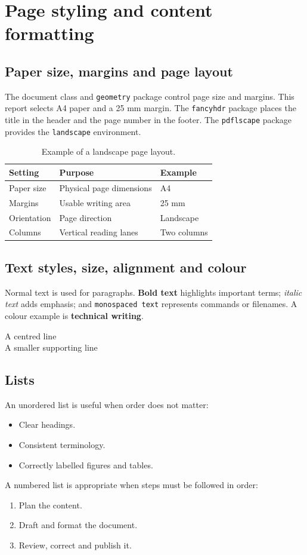 \section{Page styling and content formatting}\label{sec:formatting}
\subsection{Paper size, margins and page layout}
The document class and \texttt{geometry} package control page size and margins. This report selects A4 paper and a 25 mm margin. The \texttt{fancyhdr} package places the title in the header and the page number in the footer. The \texttt{pdflscape} package provides the \texttt{landscape} environment.
\begin{landscape}
\begin{table}[H]\centering
\caption{Example of a landscape page layout.}
\begin{tabularx}{0.88\linewidth}{lXl}
\toprule Setting & Purpose & Example\\\midrule
Paper size & Physical page dimensions & A4\\
Margins & Usable writing area & 25 mm\\
Orientation & Page direction & Landscape\\
Columns & Vertical reading lanes & Two columns\\
\bottomrule
\end{tabularx}
\end{table}
\end{landscape}
\subsection{Text styles, size, alignment and colour}
Normal text is used for paragraphs. \textbf{Bold text} highlights important terms; \textit{italic text} adds emphasis; and \texttt{monospaced text} represents commands or filenames. A colour example is {\color{Teal}\textbf{technical writing}}.
\begin{center}{\Large A centred line}\\[4pt]{\small A smaller supporting line}\end{center}
\subsection{Lists}
An unordered list is useful when order does not matter:
\begin{itemize}\item Clear headings.\item Consistent terminology.\item Correctly labelled figures and tables.\end{itemize}
A numbered list is appropriate when steps must be followed in order:
\begin{enumerate}\item Plan the content.\item Draft and format the document.\item Review, correct and publish it.\end{enumerate}
